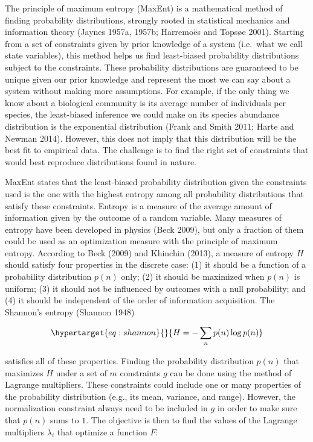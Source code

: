 \documentclass[10pt,oneside]{article}
\begin{document}
The principle of maximum entropy (MaxEnt) is a mathematical method of
finding probability distributions, strongly rooted in statistical
mechanics and information theory (Jaynes 1957a, 1957b; Harremoës and
Topsøe 2001). Starting from a set of constraints given by prior
knowledge of a system (i.e.~what we call state variables), this method
helps us find least-biased probability distributions subject to the
constraints. These probability distributions are guaranteed to be unique
given our prior knowledge and represent the most we can say about a
system without making more assumptions. For example, if the only thing
we know about a biological community is its average number of
individuals per species, the least-biased inference we could make on its
species abundance distribution is the exponential distribution (Frank
and Smith 2011; Harte and Newman 2014). However, this does not imply
that this distribution will be the best fit to empirical data. The
challenge is to find the right set of constraints that would best
reproduce distributions found in nature.

MaxEnt states that the least-biased probability distribution given the
constraints used is the one with the highest entropy among all
probability distributions that satisfy these constraints. Entropy is a
measure of the average amount of information given by the outcome of a
random variable. Many measures of entropy have been developed in physics
(Beck 2009), but only a fraction of them could be used as an
optimization measure with the principle of maximum entropy. According to
Beck (2009) and Khinchin (2013), a measure of entropy \(H\) should
satisfy four properties in the discrete case: (1) it should be a
function of a probability distribution \(p(n)\) only; (2) it should be
maximized when \(p(n)\) is uniform; (3) it should not be influenced by
outcomes with a null probability; and (4) it should be independent of
the order of information acquisition. The Shannon's entropy (Shannon
1948)

\begin{equation}\protect\hypertarget{eq:shannon}{}{H = -\sum_{n} p(n) \log p(n)}\label{eq:shannon}\end{equation}

satisfies all of these properties. Finding the probability distribution
\(p(n)\) that maximizes \(H\) under a set of \(m\) constraints \(g\) can
be done using the method of Lagrange multipliers. These constraints
could include one or many properties of the probability distribution
(e.g., its mean, variance, and range). However, the normalization
constraint always need to be included in \(g\) in order to make sure
that \(p(n)\) sums to \(1\). The objective is then to find the values of
the Lagrange multipliers \(\lambda_i\) that optimize a function \(F\):
\end{document}
